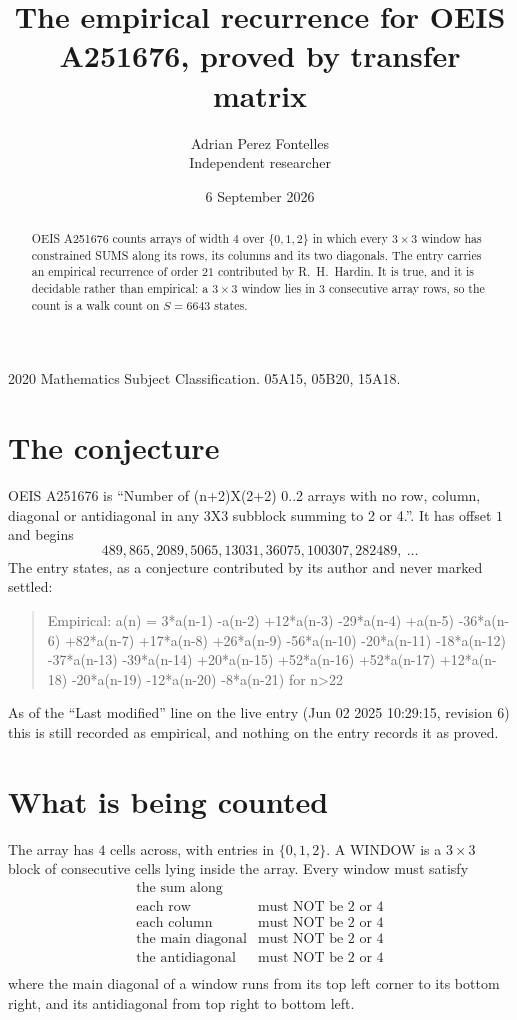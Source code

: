 \documentclass[11pt,a4paper]{article}
\title{The empirical recurrence for OEIS A251676, proved by transfer matrix}
\author{Adrian Perez Fontelles\\ \small Independent researcher}
\date{6 September 2026}
\theoremstyle{plain}
\theoremstyle{definition}
\begin{document}
\maketitle

\begin{abstract}
OEIS A251676 counts arrays of width $4$ over $\{0,1,2\}$ in which every $3\times3$ window has
constrained SUMS along its rows, its columns and its two diagonals. The entry carries an
empirical recurrence of order $21$ contributed by R.~H.~Hardin. It is true, and it is
decidable rather than empirical: a $3\times3$ window lies in $3$ consecutive array rows,
so the count is a walk count on $S=6643$ states.
\end{abstract}

\noindent\small 2020 Mathematics Subject Classification. 05A15, 05B20, 15A18.\normalsize

\section{The conjecture}

OEIS A251676 is ``Number of (n+2)X(2+2) 0..2 arrays with no row, column, diagonal or antidiagonal in any 3X3 subblock summing to 2 or 4.''. It has offset $1$ and begins
\[
489, 865, 2089, 5065, 13031, 36075, 100307, 282489,\ \dots
\]
The entry states, as a conjecture contributed by its author and never marked settled:
\begin{quote}
Empirical: a(n) = 3*a(n-1) -a(n-2) +12*a(n-3) -29*a(n-4) +a(n-5) -36*a(n-6) +82*a(n-7) +17*a(n-8) +26*a(n-9) -56*a(n-10) -20*a(n-11) -18*a(n-12) -37*a(n-13) -39*a(n-14) +20*a(n-15) +52*a(n-16) +52*a(n-17) +12*a(n-18) -20*a(n-19) -12*a(n-20) -8*a(n-21) for n>22
\end{quote}
As of the ``Last modified'' line on the live entry (Jun 02 2025 10:29:15, revision 6) this is still
recorded as empirical, and nothing on the entry records it as proved.

\section{What is being counted}

The array has $4$ cells across, with entries in $\{0,1,2\}$. A WINDOW is a $3\times3$ block
of consecutive cells lying inside the array. Every window must satisfy
\[
\begin{array}{ll}
\text{the sum along} & \text{} \\[2pt]
\text{each row} & \text{must NOT be 2 or 4} \\
\text{each column} & \text{must NOT be 2 or 4} \\
\text{the main diagonal} & \text{must NOT be 2 or 4} \\
\text{the antidiagonal} & \text{must NOT be 2 or 4} \\
\end{array}
\]
where the main diagonal of a window runs from its top left corner to its bottom right, and its
antidiagonal from top right to bottom left.
\end{document}
